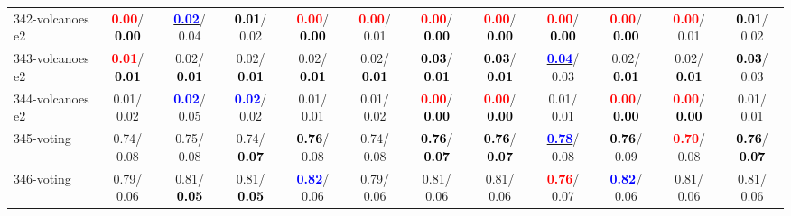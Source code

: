 \begin{table}[h]
\begin{center}
{\begin{tabular}{lc|c|c|c|c|c|c|c|c|c|c}
342-volcanoes e2 & \textcolor{red}{\textbf{  0.00}}/\textcolor{black}{\textbf{  0.00}} & \underline{\textcolor{blue}{\textbf{  0.02}}}/  0.04 & \textcolor{black}{\textbf{  0.01}}/  0.02 & \textcolor{red}{\textbf{  0.00}}/\textcolor{black}{\textbf{  0.00}} & \textcolor{red}{\textbf{  0.00}}/  0.01 & \textcolor{red}{\textbf{  0.00}}/\textcolor{black}{\textbf{  0.00}} & \textcolor{red}{\textbf{  0.00}}/\textcolor{black}{\textbf{  0.00}} & \textcolor{red}{\textbf{  0.00}}/\textcolor{black}{\textbf{  0.00}} & \textcolor{red}{\textbf{  0.00}}/\textcolor{black}{\textbf{  0.00}} & \textcolor{red}{\textbf{  0.00}}/  0.01 & \textcolor{black}{\textbf{  0.01}}/  0.02 \\
343-volcanoes e2 & \textcolor{red}{\textbf{  0.01}}/\textcolor{black}{\textbf{  0.01}} &   0.02/\textcolor{black}{\textbf{  0.01}} &   0.02/\textcolor{black}{\textbf{  0.01}} &   0.02/\textcolor{black}{\textbf{  0.01}} &   0.02/\textcolor{black}{\textbf{  0.01}} & \textcolor{black}{\textbf{  0.03}}/\textcolor{black}{\textbf{  0.01}} & \textcolor{black}{\textbf{  0.03}}/\textcolor{black}{\textbf{  0.01}} & \underline{\textcolor{blue}{\textbf{  0.04}}}/  0.03 &   0.02/\textcolor{black}{\textbf{  0.01}} &   0.02/\textcolor{black}{\textbf{  0.01}} & \textcolor{black}{\textbf{  0.03}}/  0.03 \\
344-volcanoes e2 &   0.01/  0.02 & \textcolor{blue}{\textbf{  0.02}}/  0.05 & \textcolor{blue}{\textbf{  0.02}}/  0.02 &   0.01/  0.01 &   0.01/  0.02 & \textcolor{red}{\textbf{  0.00}}/\textcolor{black}{\textbf{  0.00}} & \textcolor{red}{\textbf{  0.00}}/\textcolor{black}{\textbf{  0.00}} &   0.01/  0.01 & \textcolor{red}{\textbf{  0.00}}/\textcolor{black}{\textbf{  0.00}} & \textcolor{red}{\textbf{  0.00}}/\textcolor{black}{\textbf{  0.00}} &   0.01/  0.01 \\
345-voting &   0.74/  0.08 &   0.75/  0.08 &   0.74/\textcolor{black}{\textbf{  0.07}} & \textcolor{black}{\textbf{  0.76}}/  0.08 &   0.74/  0.08 & \textcolor{black}{\textbf{  0.76}}/\textcolor{black}{\textbf{  0.07}} & \textcolor{black}{\textbf{  0.76}}/\textcolor{black}{\textbf{  0.07}} & \underline{\textcolor{blue}{\textbf{  0.78}}}/  0.08 & \textcolor{black}{\textbf{  0.76}}/  0.09 & \textcolor{red}{\textbf{  0.70}}/  0.08 & \textcolor{black}{\textbf{  0.76}}/\textcolor{black}{\textbf{  0.07}} \\
346-voting &   0.79/  0.06 &   0.81/\textcolor{black}{\textbf{  0.05}} &   0.81/\textcolor{black}{\textbf{  0.05}} & \textcolor{blue}{\textbf{  0.82}}/  0.06 &   0.79/  0.06 &   0.81/  0.06 &   0.81/  0.06 & \textcolor{red}{\textbf{  0.76}}/  0.07 & \textcolor{blue}{\textbf{  0.82}}/  0.06 &   0.81/  0.06 &   0.81/  0.06 \\

\end{tabular}}
\end{center}
\end{table}
